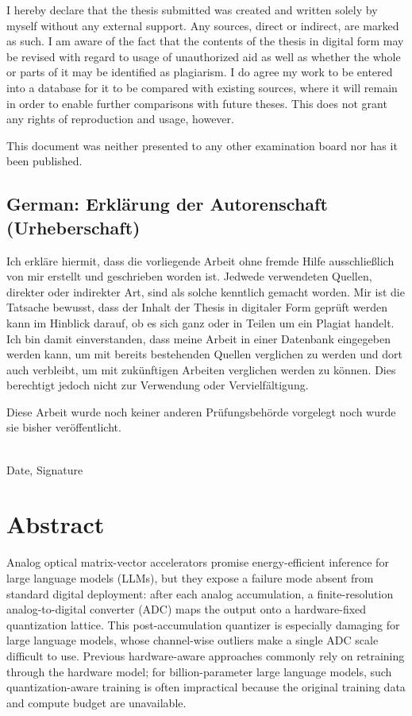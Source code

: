 \documentclass[a4paper,11pt,oneside]{article}
\theoremstyle{breakstyle}
\begin{document}
  I hereby declare that the thesis submitted was created and written
  solely by myself without any external support. Any sources, direct
  or indirect, are marked as such. I am aware of the fact that the
  contents of the thesis in digital form may be revised with regard to
  usage of unauthorized aid as well as whether the whole or parts of
  it may be identified as plagiarism. I do agree my work to be entered
  into a database for it to be compared with existing sources, where
  it will remain in order to enable further comparisons with future
  theses. This does not grant any rights of reproduction and usage,
  however.

  This document was neither presented to any other examination board
  nor has it been published.

  \subsection*{German: Erklärung der Autorenschaft (Urheberschaft)}
 
  Ich erkläre hiermit, dass die vorliegende Arbeit ohne fremde Hilfe
  ausschließlich von mir erstellt und geschrieben worden ist. Jedwede
  verwendeten Quellen, direkter oder indirekter Art, sind als solche
  kenntlich gemacht worden. Mir ist die Tatsache bewusst, dass der
  Inhalt der Thesis in digitaler Form geprüft werden kann im Hinblick
  darauf, ob es sich ganz oder in Teilen um ein Plagiat handelt. Ich
  bin damit einverstanden, dass meine Arbeit in einer Datenbank
  eingegeben werden kann, um mit bereits bestehenden Quellen
  verglichen zu werden und dort auch verbleibt, um mit zukünftigen
  Arbeiten verglichen werden zu können. Dies berechtigt jedoch nicht
  zur Verwendung oder Vervielfältigung.

  Diese Arbeit wurde noch keiner anderen Prüfungsbehörde vorgelegt
  noch wurde sie bisher veröffentlicht.

  \vspace{20mm}

  \dotfill\\
  Date, Signature

  \newpage

  \section*{Abstract}

  Analog optical matrix-vector accelerators promise energy-efficient
  inference for large language models (LLMs), but they expose a
  failure mode absent from standard digital deployment: after each
  analog accumulation, a finite-resolution analog-to-digital
  converter (ADC) maps the output onto a hardware-fixed quantization
  lattice. This post-accumulation quantizer is especially damaging
  for large language models, whose channel-wise outliers make a
  single ADC scale difficult to use. Previous hardware-aware
  approaches commonly rely on retraining through the hardware model;
  for billion-parameter large language models, such
  quantization-aware training is often impractical because the
  original training data and compute budget are unavailable.
\end{document}
